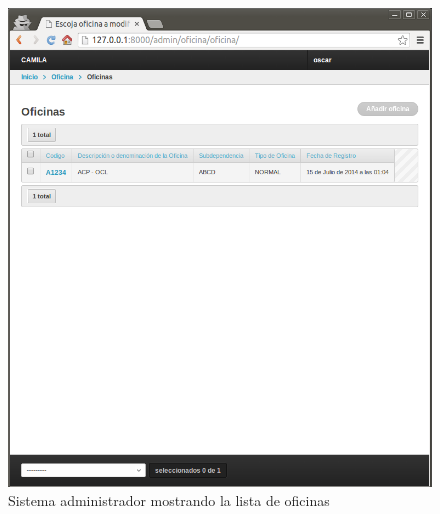\begin{figure}[h!]
  \centering
  \includegraphics[scale=0.4]{images/activities/camila/admin-oficinas-1.png}
  \caption{Sistema administrador mostrando la lista de oficinas}
  \label{fig:admin-oficinas-1}
\end{figure}

